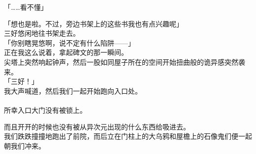 「……看不懂」

「想也是啦。不过，旁边书架上的这些书我也有点兴趣呢」\\

三好悠闲地往书架走去。\\

「你别瞎晃悠啊，说不定有什么陷阱——」\\

正在我这么说着，拿起碑文的那一瞬间。\\

尖塔上突然响起钟声，然后一股如同屋子所在的空间开始扭曲般的诡异感突然袭来。\\

「三好！」\\

我大声喊道，然后我们一起开始跑向入口处。\\

\sqsplit\\

所幸入口大门没有被锁上。

而且开开的时候也没有被从异次元出现的什么东西给吸进去。\\

我们跌跌撞撞地跑出了前院，而后立在门柱上的大乌鸦和屋檐上的石像鬼们便一起朝我们冲来。

